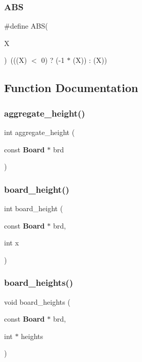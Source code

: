 \subsubsection{A\+BS}
{\footnotesize\ttfamily \#define A\+BS(\begin{DoxyParamCaption}\item[{}]{X }\end{DoxyParamCaption})~(((X) $<$ 0) ? (-\/1 $\ast$ (X)) \+: (X))}



\subsection{Function Documentation}
\mbox{\label{tools_8h_ad841ef8c1553fc39aedf9ff99c4338c8}} 
\subsubsection{aggregate\+\_\+height()}
{\footnotesize\ttfamily int aggregate\+\_\+height (\begin{DoxyParamCaption}\item[{const \textbf{ Board} $\ast$}]{brd }\end{DoxyParamCaption})}

\mbox{\label{tools_8h_a91ae5afacda12393e4a93ca8c298832c}} 
\subsubsection{board\+\_\+height()}
{\footnotesize\ttfamily int board\+\_\+height (\begin{DoxyParamCaption}\item[{const \textbf{ Board} $\ast$}]{brd,  }\item[{int}]{x }\end{DoxyParamCaption})}

\mbox{\label{tools_8h_a0074ffa2b0873ffccfdbc813ccf02ba0}} 
\subsubsection{board\+\_\+heights()}
{\footnotesize\ttfamily void board\+\_\+heights (\begin{DoxyParamCaption}\item[{const \textbf{ Board} $\ast$}]{brd,  }\item[{int $\ast$}]{heights }\end{DoxyParamCaption})}


